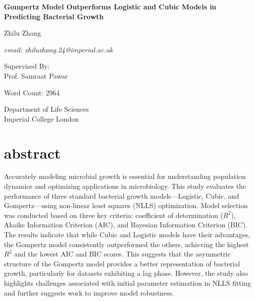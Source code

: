 \documentclass{article}
\begin{document}
\begin{titlepage}
    \begin{center}
        \vspace*{5cm}
        
        \Large
        \textbf{Gompertz Model Outperforms Logistic and Cubic Models in Predicting Bacterial Growth}
        
        \vspace{1.5cm}
        
        \Large
        Zhilu Zhang
        
        \vspace{0.5cm}
        
        \textit{email: zhiluzhang.24@imperial.ac.uk}
        
        \vfill
        
        Supervised By: \\
        Prof. Samraat Pawar
        
        \vspace{0.8cm}
        
        \Large
        Word Count: 2964
        
        \vspace{0.8cm}
        
        Department of Life Sciences \\
        Imperial College London
    \end{center}
\end{titlepage}

\section{abstract}
Accurately modeling microbial growth is essential for understanding population dynamics and optimizing applications in microbiology. This study evaluates the performance of three standard bacterial growth models—Logistic, Cubic, and Gompertz—using non-linear least squares (NLLS) optimization. Model selection was conducted based on three key criteria: coefficient of determination (\( R^2 \)), Akaike Information Criterion (AIC), and Bayesian Information Criterion (BIC).
The results indicate that while Cubic and Logistic models have their advantages, the Gompertz model consistently outperformed the others, achieving the highest \( R^2 \) and the lowest AIC and BIC scores. This suggests that the asymmetric structure of the Gompertz model provides a better representation of bacterial growth, particularly for datasets exhibiting a lag phase. However, the study also highlights challenges associated with initial parameter estimation in NLLS fitting and further suggests work to improve model robustness.
\end{document}
